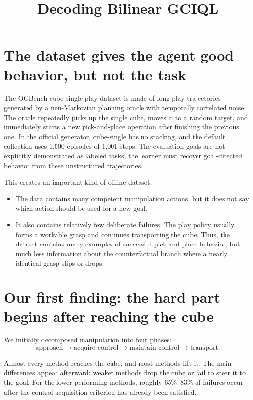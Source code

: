 \documentclass[12pt]{article}
\title{Decoding Bilinear GCIQL}
\author{}
\date{}
\begin{document}
\maketitle

\section*{The dataset gives the agent good behavior, but not the task}
The OGBench cube-single-play dataset is made of long play trajectories generated by a non-Markovian planning oracle with temporally correlated noise. The oracle repeatedly picks up the single cube, moves it to a random target, and immediately starts a new pick-and-place operation after finishing the previous one. In the official generator, cube-single has no stacking, and the default collection uses 1,000 episodes of 1,001 steps. The evaluation goals are not explicitly demonstrated as labeled tasks; the learner must recover goal-directed behavior from these unstructured trajectories. 

This creates an important kind of offline dataset:
\begin{itemize}
    \item The data contains many competent manipulation actions, but it does not say which action should be used for a new goal.
    \item It also contains relatively few deliberate failures. The play policy usually forms a workable grasp and continues transporting the cube. Thus, the dataset contains many examples of successful pick-and-place behavior, but much less information about the counterfactual branch where a nearly identical grasp slips or drops.
\end{itemize}

\section*{Our first finding: the hard part begins after reaching the cube}
We initially decomposed manipulation into four phases:
$$ \text{approach} \rightarrow \text{acquire control} \rightarrow \text{maintain control} \rightarrow \text{transport}. $$

Almost every method reaches the cube, and most methods lift it. The main differences appear afterward: weaker methods drop the cube or fail to steer it to the goal. For the lower-performing methods, roughly 65\%--83\% of failures occur after the control-acquisition criterion has already been satisfied. 
\end{document}
